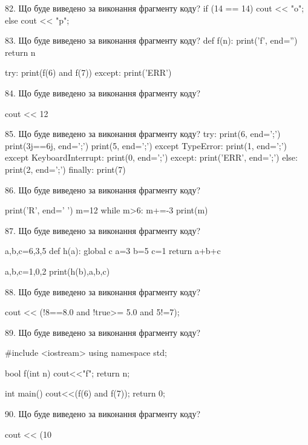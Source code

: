 \documentclass[11pt]{article}
\begin{document}

82. Що буде виведено за виконання фрагменту коду?
if (14 == 14)
    cout << "o";
else
    cout << "p";



83. Що буде виведено за виконання фрагменту коду?
def f(n):
    print('f', end='')
    return n

try:
    print(f(6) and f(7))
except:
    print('ERR')


84. Що буде виведено за виконання фрагменту коду?

cout << 12 %


85. Що буде виведено за виконання фрагменту коду?
try:
    print(6, end=';')
    print(3j==6j, end=';')
    print(5, end=';')
except TypeError:
    print(1, end=';')
except KeyboardInterrupt:
    print(0, end=';')
except:
    print('ERR', end=';')
else:
    print(2, end=';')
finally:
    print(7)


86. Що буде виведено за виконання фрагменту коду?

print('R', end=' ')
m=12
while m>6:
    m+=-3
print(m)



87. Що буде виведено за виконання фрагменту коду?

a,b,c=6,3,5
def h(a):
global c    a=3
    b=5
    c=1
    return a+b+c

a,b,c=1,0,2
print(h(b),a,b,c)


88. Що буде виведено за виконання фрагменту коду?

cout << (!8==8.0 and !true>= 5.0 and 5!=7);


89. Що буде виведено за виконання фрагменту коду?

#include <iostream>
using namespace std;

bool f(int n){
    cout<<"f";
    return n;
}

int main(){
    cout<<(f(6) and f(7));
    return 0;
}


90. Що буде виведено за виконання фрагменту коду?

cout << (10 %
\end{document}
